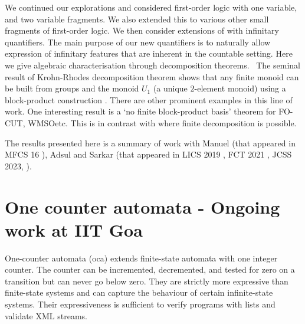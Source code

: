 \documentclass[a4paper,10pt]{article}
\theoremstyle{open}
\newcommand{\focut}{FO-CUT}
\newcommand{\fofinite}{WMSO}
\begin{document}
We continued our explorations and considered first-order logic with one variable, and two variable fragments. We also extended this to various other small fragments of first-order logic.
We then consider extensions of \fo with infinitary quantifiers.
The main purpose
of our new quantifiers is to naturally allow expression of
infinitary features that are inherent in the countable setting. Here we give algebraic characterisation through decomposition theorems. \
The seminal result of Krohn-Rhodes decomposition theorem \cite{kr65} shows that any finite monoid can be built from groups and the monoid $U_1$ (a unique $2$-element monoid) using a block-product construction \cite{str_cirBook}. There are other prominent examples in this line of work. One interesting result is a `no finite block-product basis' theorem for \focut, \fofinite etc. This is in contrast with \fo
where finite decomposition is possible.

The results presented here is a summary of work with Manuel (that appeared in MFCS 16 \cite{ms16}), Adsul and Sarkar (that appeared in LICS 2019 \cite{lics19}, FCT 2021 \cite{fct21}, JCSS 2023, \cite{jcss23}).

\section{One counter automata - Ongoing work at IIT Goa}
One-counter automata (oca) extends finite-state automata with one integer counter. The counter can be
incremented, decremented, and tested for zero on a transition but can never go below zero. They are strictly
more expressive than finite-state systems and can capture the behaviour of certain infinite-state systems.
Their expressiveness is sufficient to verify programs with lists and validate XML streams.
\end{document}
